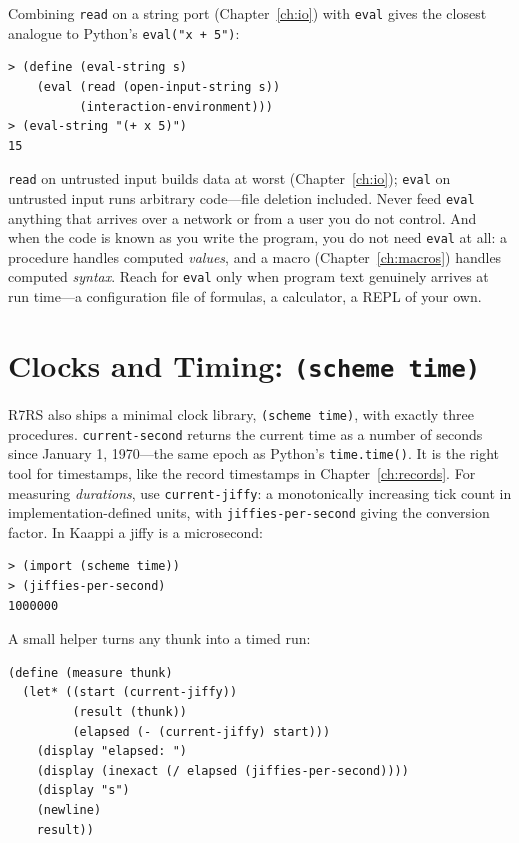 Combining \texttt{read} on a string port (Chapter~\ref{ch:io}) with \texttt{eval} gives the closest analogue to Python's \texttt{eval("x + 5")}:

\begin{lstlisting}[style=repl]
> (define (eval-string s)
    (eval (read (open-input-string s))
          (interaction-environment)))
> (eval-string "(+ x 5)")
15
\end{lstlisting}

\begin{warning}
\texttt{read} on untrusted input builds data at worst (Chapter~\ref{ch:io}); \texttt{eval} on untrusted input runs arbitrary code---file deletion included. Never feed \texttt{eval} anything that arrives over a network or from a user you do not control. And when the code is known as you write the program, you do not need \texttt{eval} at all: a procedure handles computed \emph{values}, and a macro (Chapter~\ref{ch:macros}) handles computed \emph{syntax}. Reach for \texttt{eval} only when program text genuinely arrives at run time---a configuration file of formulas, a calculator, a REPL of your own.
\end{warning}

\section{Clocks and Timing: \texttt{(scheme time)}}

R7RS also ships a minimal clock library, \texttt{(scheme time)}, with exactly three procedures. \texttt{current-second} returns the current time as a number of seconds since January 1, 1970---the same epoch as Python's \texttt{time.time()}. It is the right tool for timestamps, like the record timestamps in Chapter~\ref{ch:records}. For measuring \emph{durations}, use \texttt{current-jiffy}: a monotonically increasing tick count in implementation-defined units, with \texttt{jiffies-per-second} giving the conversion factor. In Kaappi a jiffy is a microsecond:

\begin{lstlisting}[style=repl]
> (import (scheme time))
> (jiffies-per-second)
1000000
\end{lstlisting}

A small helper turns any thunk into a timed run:

\begin{lstlisting}
(define (measure thunk)
  (let* ((start (current-jiffy))
         (result (thunk))
         (elapsed (- (current-jiffy) start)))
    (display "elapsed: ")
    (display (inexact (/ elapsed (jiffies-per-second))))
    (display "s")
    (newline)
    result))
\end{lstlisting}

